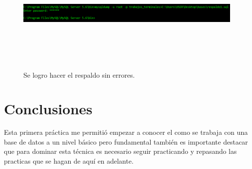 \documentclass[12pt, titlepage]{article}
\begin{document}
    \begin{figure}[H]
        \begin{center}
            \includegraphics[width=12cm, height=6cm]{img/respaldo.png}
            \caption{Se logro hacer el respaldo sin errores.}
            \label{fig:respaldo}
        \end{center}
    \end{figure}
    \section{Conclusiones}
    Esta primera práctica me permitió empezar a conocer el como se trabaja con una base de datos a un nivel básico pero fundamental también es importante destacar que para dominar esta técnica es necesario seguir practicando y repasando las practicas que se hagan de aquí en adelante.
     
    
\end{document}
